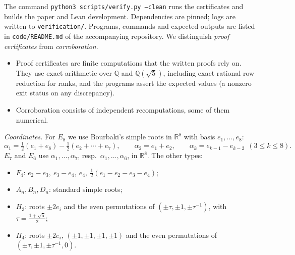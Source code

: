 \documentclass[11pt]{amsart}
\theoremstyle{definition}
\newcommand{\Q}{\mathbb{Q}}
\begin{document}
The command \texttt{python3 scripts/verify.py --clean} runs the certificates and builds the paper
and Lean development. Dependencies are pinned; logs are written to \texttt{verification/}.
Programs, commands and expected outputs are listed in \texttt{code/README.md} of the accompanying repository. We
distinguish \emph{proof certificates} from \emph{corroboration}.
\begin{itemize}
\item Proof certificates are finite computations that the written proofs rely on. They use exact arithmetic over
$\Q$ and $\Q(\sqrt5)$, including exact rational row reduction for ranks, and the programs assert the expected values
(a nonzero exit status on any discrepancy).
\item Corroboration consists of independent recomputations, some of them numerical.
\end{itemize}

\emph{Coordinates.} For $E_8$ we use Bourbaki's simple roots in $\mathbb R^8$ with basis $e_1,\dots,e_8$:
\[\alpha_1=\tfrac12(e_1+e_8)-\tfrac12(e_2+\cdots+e_7),\qquad\alpha_2=e_1+e_2,\qquad\alpha_k=e_{k-1}-e_{k-2}\ \ (3\le k\le8).\]
$E_7$ and $E_6$ use $\alpha_1,\dots,\alpha_7$, resp.\ $\alpha_1,\dots,\alpha_6$, in $\mathbb R^8$. The other types:
\begin{itemize}
\item $F_4$: $e_2-e_3,\ e_3-e_4,\ e_4,\ \frac12(e_1-e_2-e_3-e_4)$;
\item $A_n,B_n,D_n$: standard simple roots;
\item $H_3$: roots $\pm2e_i$ and the even permutations of $(\pm\tau,\pm1,\pm\tau^{-1})$, with $\tau=\frac{1+\sqrt5}2$;
\item $H_4$: roots $\pm2e_i$, $(\pm1,\pm1,\pm1,\pm1)$ and the even permutations of $(\pm\tau,\pm1,\pm\tau^{-1},0)$.
\end{itemize}
\end{document}
